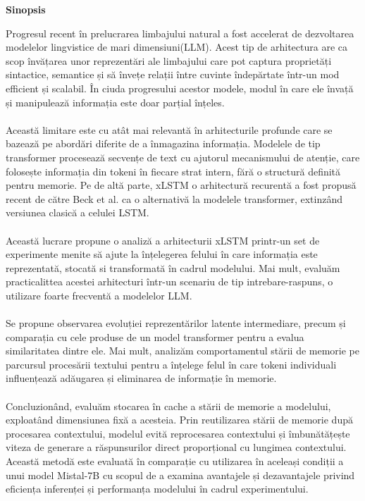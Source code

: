 \begin{center}
{\Large \textbf{Sinopsis}}
\end{center}
Progresul recent în prelucrarea limbajului natural a fost accelerat de 
dezvoltarea modelelor lingvistice de mari dimensiuni(LLM). Acest tip de arhitectura 
are ca scop învățarea unor reprezentări ale limbajului care pot captura proprietăți 
sintactice, semantice și să învețe relații între cuvinte îndepărtate într-un mod efficient
și scalabil. În ciuda progresului acestor modele, modul în care ele 
învață și manipulează informația este doar parțial înțeles. \\ \\
%
Această limitare este cu atât mai relevantă în arhitecturile profunde care se bazează pe 
abordări diferite de a înmagazina informația. Modelele de tip transformer procesează
secvențe de text cu ajutorul mecanismului de atenție, care folosește informația din tokeni în fiecare
strat intern, fără o structură definită pentru memorie. Pe de altă parte, xLSTM o arhitectură 
recurentă a fost propusă recent de către Beck et al.\cite{beck2024xlstmextendedlongshortterm} ca o 
alternativă la modelele transformer, extinzând versiunea clasică a celulei LSTM. \\ \\
%
Această lucrare propune o analiză a arhitecturii xLSTM printr-un set de experimente menite să 
ajute la înțelegerea felului în care informația este reprezentată, stocată si transformată în cadrul modelului. 
Mai mult, evaluăm practicalittea acestei arhitecturi într-un scenariu de tip
intrebare-raspuns, o utilizare foarte frecventă a modelelor LLM. \\ \\
%
Se propune observarea evoluției reprezentărilor latente intermediare, precum și comparația cu cele produse de 
un model transformer pentru a evalua similaritatea dintre ele. 
Mai mult, analizăm comportamentul stării de memorie pe parcursul procesării textului pentru a 
înțelege felul în care tokeni individuali influențează adăugarea 
și eliminarea de informație în memorie. \\ \\ 
%
Concluzionând, evaluăm stocarea în cache a stării de memorie a modelului, exploatând dimensiunea
fixă a acesteia. Prin reutilizarea stării de memorie după procesarea contextului, modelul evită reprocesarea contextului
și îmbunătățește viteza de generare a răspunsurilor direct proporțional cu lungimea contextului. 
Această metodă este evaluată în comparație cu utilizarea în aceleași condiții a unui model Mistal-7B cu scopul de a examina
avantajele și dezavantajele privind eficiența inferenței și performanța modelului în cadrul experimentului.